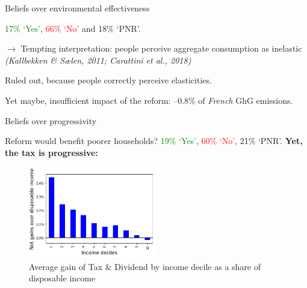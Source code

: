 \documentclass[aspectratio=169,9pt,dvipsnames]{beamer}
\begin{document}

\begin{frame}{Beliefs over environmental effectiveness}\label{elast_origin}

    \textcolor{Green}{17\% `Yes'}, \textcolor{red}{66\% `No'} and 18\% `PNR'.
    
    \pause
    \medskip
    
    $\rightarrow$ Tempting interpretation: people perceive aggregate consumption as inelastic \\ \textcolor{teal_dark}{{\small \textit{(Kallbekken \& Sælen, 2011; Carattini et al., 2018)}}}
    
    \pause
    
    \medskip
    
    Ruled out, because people correctly perceive elasticities. \hyperlink{elast_target}{}
    
    
    \medskip
    
    Yet maybe, insufficient impact of the reform: --0.8\% of \textit{French} GhG emissions.
    
        \end{frame}
    \begin{frame}{Beliefs over progressivity}

Reform would benefit poorer households? \textcolor{Green}{19\% `Yes'}, \textcolor{red}{60\% `No'}, 21\% `PNR'. 
\medskip
\textbf{Yet, the tax is progressive:}

\medskip

\begin{figure}
  \includegraphics[width=0.5\textwidth]{Images/progressivity_relative.png}
  \caption{Average gain of Tax \& Dividend by income decile as a share of disposable income}
\end{figure}


    \end{frame}
\end{document}

